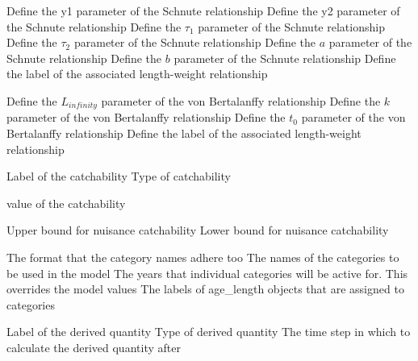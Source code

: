 \par\textbf{}\par
{} {Define the y1 parameter of the Schnute relationship}
 {Define the y2 parameter of the Schnute relationship}
 {Define the $\tau_1$ parameter of the Schnute relationship}
 {Define the $\tau_2$ parameter of the Schnute relationship}
 {Define the $a$ parameter of the Schnute relationship}
 {Define the $b$ parameter of the Schnute relationship}
 {Define the label of the associated length-weight relationship}
\par\textbf{}\par
{} {Define the $L_{infinity}$ parameter of the von Bertalanffy relationship}
 {Define the $k$ parameter of the von Bertalanffy relationship}
 {Define the $t_0$ parameter of the von Bertalanffy relationship}
 {Define the label of the associated length-weight relationship}
\par\par
{} {Label of the catchability}
 {Type of catchability}
\par\textbf{}\par
{} {value of the catchability}
\par\textbf{}\par
{} {Upper bound for nuisance catchability}
 {Lower bound for nuisance catchability}
\par\par
{} {The format that the category names adhere too}
 {The names of the categories to be used in the model}
 {The years that individual categories will be active for. This overrides the model values}
 {The labels of age\_length objects that are assigned to categories}
\par\par
{} {Label of the derived quantity}
 {Type of derived quantity}
 {The time step in which to calculate the derived quantity after}
